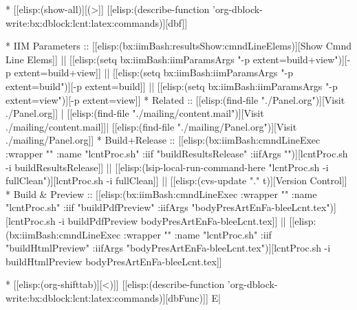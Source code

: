 \begin{whenOrg}
* [[elisp:(show-all)][(>]] [[elisp:(describe-function 'org-dblock-write:bx:dblock:lcnt:latex:commands)][dbf]]
\begin{whenOrg}
*      IIM Parameters    ::  [[elisp:(bx:iimBash:resultsShow:cmndLineElems)][Show Cmnd Line Elems]] || [[elisp:(setq bx:iimBash:iimParamsArgs "-p extent=build+view")][-p extent=build+view]] || [[elisp:(setq bx:iimBash:iimParamsArgs "-p extent=build")][-p extent=build]] || [[elisp:(setq bx:iimBash:iimParamsArgs "-p extent=view")][-p extent=view]]
*      Related           ::  [[elisp:(find-file "./Panel.org")][Visit ./Panel.org]] | [[elisp:(find-file "./mailing/content.mail")][Visit ./mailing/content.mail]]| [[elisp:(find-file "./mailing/Panel.org")][Visit ./mailing/Panel.org]]
*      Build+Release     ::  [[elisp:(bx:iimBash:cmndLineExec :wrapper "" :name "lcntProc.sh" :iif "buildResultsRelease" :iifArgs "")][lcntProc.sh -i buildResultsRelease]] || [[elisp:(lsip-local-run-command-here "lcntProc.sh -i fullClean")][lcntProc.sh -i fullClean]] || [[elisp:(cvs-update "." t)][Version Control]]
*      Build & Preview   ::  [[elisp:(bx:iimBash:cmndLineExec :wrapper "" :name "lcntProc.sh" :iif "buildPdfPreview" :iifArgs "bodyPresArtEnFa-bleeLcnt.tex")][lcntProc.sh -i buildPdfPreview bodyPresArtEnFa-bleeLcnt.tex]] || [[elisp:(bx:iimBash:cmndLineExec :wrapper "" :name "lcntProc.sh" :iif "buildHtmlPreview" :iifArgs "bodyPresArtEnFa-bleeLcnt.tex")][lcntProc.sh -i buildHtmlPreview bodyPresArtEnFa-bleeLcnt.tex]]

* [[elisp:(org-shifttab)][<)]] [[elisp:(describe-function 'org-dblock-write:bx:dblock:lcnt:latex:commands)][dbFunc)]]  E|
\end{whenOrg}

\end{whenOrg}
